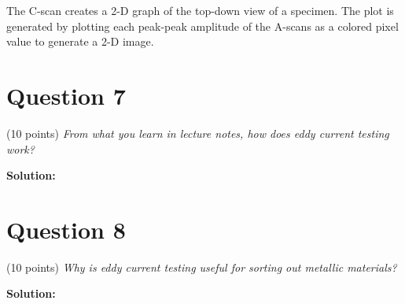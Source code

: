 \documentclass[12 pt]{article}
\begin{document}
The C-scan creates a 2-D graph of the top-down view of a specimen. The plot is generated by plotting each peak-peak amplitude of the A-scans as a colored pixel value to generate a 2-D image.

\section*{Question 7}
(\num{10} points) \textit{From what you learn in lecture notes, how does eddy current testing work?}

\textbf{Solution:}



\section*{Question 8}
(\num{10} points) \textit{Why is eddy current testing useful for sorting out metallic materials?}

\textbf{Solution:}
\end{document}

